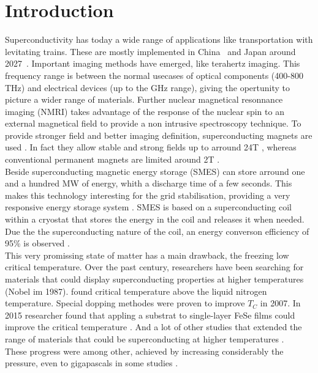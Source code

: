 \documentclass[../main.tex]{subfile}
\begin{document}
\section{Introduction}

Superconductivity has today a wide range of applications like transportation with levitating trains. These are mostly implemented in China~\cite{Roque2024} and Japan around 2027~\cite{Nishijima2013}.
Important imaging methods have emerged, like terahertz imaging. This frequency range is between the normal usecases of 
optical components (400-800 THz) and electrical devices (up to the GHz range), giving the opertunity to picture a wider range of materials.
Further nuclear magnetical resonnance imaging (NMRI) takes advantage of the response of the nuclear spin to an external 
magnetical field to provide a non intrusive spectroscopy technique. To provide stronger field and better imaging definition, superconducting magnets are used \cite{Nakamura2015}. In fact they
allow stable and strong fields up to arround 24T \cite{Hashi2015}, whereas conventional permanent magnets are limited around 2T \cite{Haishi2005}.\\
Beside superconducting magnetic energy storage (SMES) can store arround one and a hundred MW of energy, whith a discharge time of a few seconds. This makes
this technology interesting for the grid stabilisation, providing a very responsive energy storage system \cite{Tixador2008}.
SMES is based on a superconducting coil within a cryostat that stores the energy in the coil and releases it when needed. Due the the superconducting nature of the coil,
an energy converson efficiency of 95\% is observed \cite{Tixador2008}.\\

This very promissing state of matter has a main drawback, the freezing low critical temperature. Over the past century, researchers 
have been searching for materials that could display superconducting properties at higher temperatures \cite{Bednorz1986} (Nobel im 1987).
\cite{PhysRevLett.58.908} found critical temperature above the liquid nitrogen temperature.
Special dopping methodes were proven to improve $T_C$ \cite{Doiron-Leyraud2007} in 2007.
In 2015 researcher found that appling a substrat to single-layer FeSe films could improve the critical temperature \cite{Ge2015}.
And a lot of other studies that extended the range of materials that could be superconducting at higher temperatures \cite{Einaga2016}\cite{Drozdov_2019} \cite{lee2023}.\\
These progress were among other, achieved by increasing considerably the pressure, even to gigapascals in some studies \cite{Drozdov_2019}.\\
\end{document}
